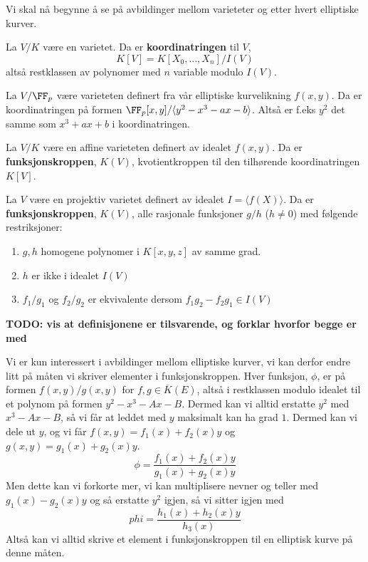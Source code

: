 Vi skal nå begynne å se på avbildinger mellom varieteter og etter hvert elliptiske kurver. 


\begin{definisjon}
La $V/K$ være en varietet. Da er \textbf{koordinatringen} til $V$, $$K[V] = K[X_0, \ldots, X_n] / I(V)$$ altså restklassen av polynomer med $n$ variable modulo $I(V)$. 
\end{definisjon}

\begin{eksempel}
La $V/\FF_p$ være varieteten definert fra vår elliptiske kurvelikning $f(x,y)$. Da er koordinatringen på formen $\FF_p[x,y]/\langle y^2 - x^3 - ax - b \rangle$. Altså er f.eks $y^2$ det samme som $x^3 + ax + b$ i koordinatringen.
\end{eksempel} 

\begin{definisjon}
La $V/K$ være en affine varieteten definert av idealet $f(x,y)$. Da er \textbf{funksjonskroppen}, $K(V)$, kvotientkroppen til den tilhørende koordinatringen $K[V]$.
\end{definisjon}

\begin{definisjon}
La $V$ være en projektiv varietet definert av idealet $I = \langle f(X) \rangle$. Da er \textbf{funksjonskroppen}, $K(V)$, alle rasjonale funksjoner $g/h$ ($h \neq 0$) med følgende restriksjoner:
\begin{enumerate}[noitemsep]
    \item $g,h$ homogene polynomer i $K[x,y,z]$ av samme grad.
    \item $h$ er ikke i idealet $I(V)$
    \item $f_1/g_1$ og $f_2/g_2$ er ekvivalente dersom $f_1g_2 - f_2g_1 \in I(V)$
\end{enumerate}
\end{definisjon}
\textbf{TODO: vis at definisjonene er tilsvarende, og forklar hvorfor begge er med}


Vi er kun interessert i avbildinger mellom elliptiske kurver, vi kan derfor endre litt på måten vi skriver elementer i funksjonskroppen. Hver funksjon, $\phi$, er på formen $f(x,y)/g(x,y)$ for $f, g \in \overline{K}(E)$, altså i restklassen modulo idealet til et polynom på formen $y^2 - x^3 - Ax - B$. Dermed kan vi alltid erstatte $y^2$ med $x^3-Ax-B$, så vi får at leddet med $y$ maksimalt kan ha grad $1$. Dermed kan vi dele ut $y$, og vi får $f(x,y) = f_1(x) + f_2(x)y$ og $g(x,y) = g_1(x) + g_2(x)y$.  $$\phi = \frac{f_1(x) + f_2(x)y}{g_1(x) + g_2(x)y}$$ 
Men dette kan vi forkorte mer, vi kan multiplisere nevner og teller med $g_1(x) - g_2(x)y$ og så erstatte $y^2$ igjen, så vi sitter igjen med \begin{equation}
\label{forkortet funksjon}
phi = \frac{h_1(x) + h_2(x)y}{h_3(x)}
\end{equation}
Altså kan vi alltid skrive et element i funksjonskroppen til en elliptisk kurve på denne måten.


